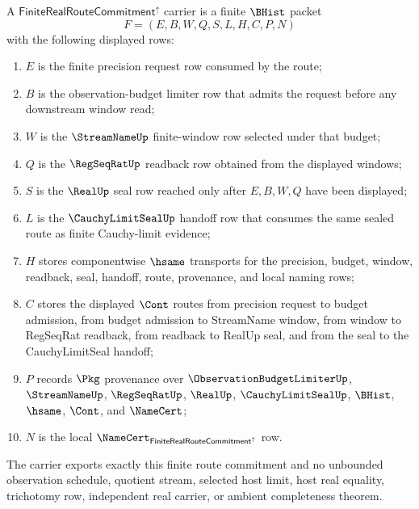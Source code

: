 \begin{definition}
\label{def:finite-real-route-commitment-carrier}
A $\mathsf{FiniteRealRouteCommitment}^{\uparrow}$ carrier is a finite $\BHist$ packet
$$
F=(E,B,W,Q,S,L,H,C,P,N)
$$
with the following displayed rows:
\begin{enumerate}
\item $E$ is the finite precision request row consumed by the route;
\item $B$ is the observation-budget limiter row that admits the request before any downstream window read;
\item $W$ is the $\StreamNameUp$ finite-window row selected under that budget;
\item $Q$ is the $\RegSeqRatUp$ readback row obtained from the displayed windows;
\item $S$ is the $\RealUp$ seal row reached only after $E,B,W,Q$ have been displayed;
\item $L$ is the $\CauchyLimitSealUp$ handoff row that consumes the same sealed route as finite Cauchy-limit evidence;
\item $H$ stores componentwise $\hsame$ transports for the precision, budget, window, readback, seal, handoff, route, provenance, and local naming rows;
\item $C$ stores the displayed $\Cont$ routes from precision request to budget admission, from budget admission to StreamName window, from window to RegSeqRat readback, from readback to RealUp seal, and from the seal to the CauchyLimitSeal handoff;
\item $P$ records $\Pkg$ provenance over $\ObservationBudgetLimiterUp$, $\StreamNameUp$, $\RegSeqRatUp$, $\RealUp$, $\CauchyLimitSealUp$, $\BHist$, $\hsame$, $\Cont$, and $\NameCert$;
\item $N$ is the local $\NameCert_{\mathsf{FiniteRealRouteCommitment}^{\uparrow}}$ row.
\end{enumerate}
The carrier exports exactly this finite route commitment and no unbounded observation schedule, quotient stream, selected host limit, host real equality, trichotomy row, independent real carrier, or ambient completeness theorem.
\end{definition}

